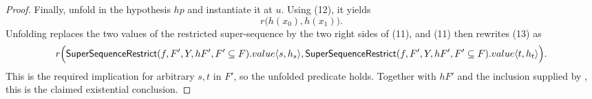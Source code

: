 \begin{proof}
Finally, unfold  in the hypothesis $hp$ and
instantiate it at $u$.  Using (12), it yields
\[
 r\bigl(h(x_0),h(x_1)\bigr).                                      \tag{13}
\]
Unfolding  replaces the two values of the
restricted super-sequence by the two right sides of (11), and (11) then
rewrites (13) as
\[
 r\Bigl(\mathsf{SuperSequenceRestrict}(f,F',Y,hF',F'\subseteq F).value
       \langle s,h_s\rangle,
       \mathsf{SuperSequenceRestrict}(f,F',Y,hF',F'\subseteq F).value
       \langle t,h_t\rangle\Bigr).
\]
This is the required implication for arbitrary $s,t$ in $F'$, so the
unfolded  predicate holds.  Together with
$hF'$ and the inclusion supplied by , this is the
claimed existential conclusion.
\end{proof}

